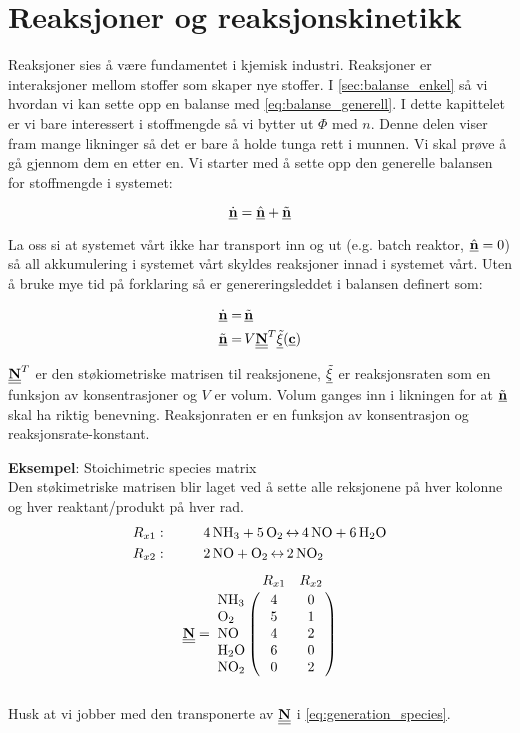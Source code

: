 \clearpage
\section{Reaksjoner og reaksjonskinetikk}\label{sec:kinetics}
Reaksjoner sies å være fundamentet i kjemisk industri. Reaksjoner er interaksjoner mellom stoffer som skaper nye stoffer. I \cref{sec:balanse_enkel} så vi hvordan vi kan sette opp en balanse med \cref{eq:balanse_generell}. I dette kapittelet er vi bare interessert i stoffmengde så vi bytter ut $\Phi$ med $n$. Denne delen viser fram mange likninger så det er bare å holde tunga rett i munnen. Vi skal prøve å gå gjennom dem en etter en. Vi starter med å sette opp den generelle balansen for stoffmengde i systemet:

\begin{equation}
    \label{eq:spacies_balance}
    \underline{\dot{\textbf{n}}} = \underline{\hat{\textbf{n}}} + \underline{\Tilde{\textbf{n}}}
\end{equation}

La oss si at systemet vårt ikke har transport inn og ut (e.g. batch reaktor, $\underline{\hat{\textbf{n}}}=0$) så all akkumulering i systemet vårt skyldes reaksjoner innad i systemet vårt. Uten å bruke mye tid på forklaring så er genereringsleddet i balansen definert som:

\begin{equation}
    \begin{split}
    \label{eq:generation_species}
    \underline{\dot{\textbf{n}}} =&\,  \underline{\Tilde{\textbf{n}}}\\
    \underline{\Tilde{\textbf{n}}}=&\,V\underline{\underline{\textbf{N}}}^T\underline{\Tilde{\xi}}(\underline{\textbf{c}})
    \end{split}
\end{equation}



$\underline{\underline{\textbf{N}}}^T$ er den støkiometriske matrisen til reaksjonene, $\underline{\Tilde{\xi}}$ er reaksjonsraten som en funksjon av konsentrasjoner og $V$ er volum. Volum ganges inn i likningen for at $\underline{\Tilde{\textbf{n}}}$ skal ha riktig benevning. Reaksjonraten er en funksjon av konsentrasjon og reaksjonsrate-konstant. 

\textbf{Eksempel}: Stoichimetric species matrix\\
Den støkimetriske matrisen blir laget ved å sette alle reksjonene på hver kolonne og hver reaktant/produkt på hver rad. 
\begin{align*}
    R_{x1}:&\hspace{1cm} \ce{4 NH3 + 5 O2 \leftrightarrow } \,\ce{ 4NO + 6 H2O} \\
    R_{x2}:&\hspace{1cm} \ce{2NO + O2 \leftrightarrow }\, \ce{ 2NO2}\\
\end{align*}
\begin{equation}
    \mymat{N} = 
    \bordermatrix{~ & R_{x1} & R_{x2}   \cr
                  \ce{NH3} & 4 & 0  \cr
                  \ce{O2} & 5 & 1 \cr
                  \ce{NO} & 4 & 2 \cr
                  \ce{H2O} & 6 & 0 \cr
                  \ce{NO2} & 0 & 2
                  }
\end{equation}\\
Husk at vi jobber med den transponerte av $\underline{\underline{\textbf{N}}}$ i \cref{eq:generation_species}. 
